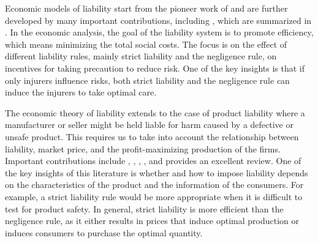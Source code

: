 \label{sec:background}



Economic models of liability start from the pioneer work of  and are further developed by many important contributions, including , which are summarized in . 
In the economic analysis, the goal of the liability system is to promote efficiency, which means minimizing the total social costs.  
The focus is on the effect of different liability rules, mainly strict liability and the negligence rule, on incentives for taking precaution to reduce risk. 
One of the key insights is that if only injurers influence risks, both strict liability and the negligence rule can induce the injurers to take optimal care.  

The economic theory of liability extends to the case of product liability where a manufacturer or seller might be held liable for harm caused by a defective or unsafe product. 
This requires us to take into account the relationship between liability, market price, and the profit-maximizing production of the firms. 
Important contributions include , , , , and  provides an excellent review. 
One of the key insights of this literature is whether and how to impose liability depends on the characteristics of the product and the information of the consumers.  
For example, a strict liability rule would be more appropriate when it is difficult to test for product safety.
In general, strict liability is more efficient than the negligence rule, as it either results in prices that induce optimal production or induces consumers to purchase the optimal quantity. 


